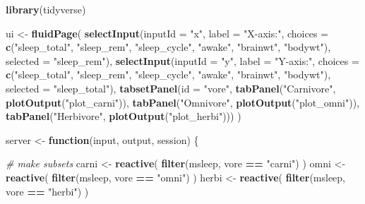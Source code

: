 \documentclass[]{book}
\newenvironment{Shaded}{\begin{snugshade}}{\end{snugshade}}
\newcommand{\CommentTok}[1]{\textcolor[rgb]{0.56,0.35,0.01}{\textit{#1}}}
\newcommand{\ControlFlowTok}[1]{\textcolor[rgb]{0.13,0.29,0.53}{\textbf{#1}}}
\newcommand{\DataTypeTok}[1]{\textcolor[rgb]{0.13,0.29,0.53}{#1}}
\newcommand{\KeywordTok}[1]{\textcolor[rgb]{0.13,0.29,0.53}{\textbf{#1}}}
\newcommand{\NormalTok}[1]{#1}
\newcommand{\OperatorTok}[1]{\textcolor[rgb]{0.81,0.36,0.00}{\textbf{#1}}}
\newcommand{\StringTok}[1]{\textcolor[rgb]{0.31,0.60,0.02}{#1}}
\begin{document}
\begin{Shaded}
\begin{Highlighting}[]
\KeywordTok{library}\NormalTok{(tidyverse)}

\NormalTok{ui <-}\StringTok{ }\KeywordTok{fluidPage}\NormalTok{(}
  \KeywordTok{selectInput}\NormalTok{(}\DataTypeTok{inputId =} \StringTok{"x"}\NormalTok{,}
              \DataTypeTok{label =} \StringTok{"X-axis:"}\NormalTok{,}
              \DataTypeTok{choices =} \KeywordTok{c}\NormalTok{(}\StringTok{"sleep_total"}\NormalTok{, }\StringTok{"sleep_rem"}\NormalTok{, }\StringTok{"sleep_cycle"}\NormalTok{, }
                          \StringTok{"awake"}\NormalTok{, }\StringTok{"brainwt"}\NormalTok{, }\StringTok{"bodywt"}\NormalTok{),}
              \DataTypeTok{selected =} \StringTok{"sleep_rem"}\NormalTok{),}
  \KeywordTok{selectInput}\NormalTok{(}\DataTypeTok{inputId =} \StringTok{"y"}\NormalTok{,}
              \DataTypeTok{label =} \StringTok{"Y-axis:"}\NormalTok{,}
              \DataTypeTok{choices =} \KeywordTok{c}\NormalTok{(}\StringTok{"sleep_total"}\NormalTok{, }\StringTok{"sleep_rem"}\NormalTok{, }\StringTok{"sleep_cycle"}\NormalTok{, }
                          \StringTok{"awake"}\NormalTok{, }\StringTok{"brainwt"}\NormalTok{, }\StringTok{"bodywt"}\NormalTok{),}
              \DataTypeTok{selected =} \StringTok{"sleep_total"}\NormalTok{),}
  \KeywordTok{tabsetPanel}\NormalTok{(}\DataTypeTok{id =} \StringTok{"vore"}\NormalTok{,}
              \KeywordTok{tabPanel}\NormalTok{(}\StringTok{"Carnivore"}\NormalTok{,}
                       \KeywordTok{plotOutput}\NormalTok{(}\StringTok{"plot_carni"}\NormalTok{)),}
              \KeywordTok{tabPanel}\NormalTok{(}\StringTok{"Omnivore"}\NormalTok{,}
                       \KeywordTok{plotOutput}\NormalTok{(}\StringTok{"plot_omni"}\NormalTok{)),}
              \KeywordTok{tabPanel}\NormalTok{(}\StringTok{"Herbivore"}\NormalTok{,}
                       \KeywordTok{plotOutput}\NormalTok{(}\StringTok{"plot_herbi"}\NormalTok{)))}
\NormalTok{)}

\NormalTok{server <-}\StringTok{ }\ControlFlowTok{function}\NormalTok{(input, output, session) \{}

  \CommentTok{# make subsets}
\NormalTok{  carni <-}\StringTok{ }\KeywordTok{reactive}\NormalTok{( }\KeywordTok{filter}\NormalTok{(msleep, vore }\OperatorTok{==}\StringTok{ "carni"}\NormalTok{) )}
\NormalTok{  omni  <-}\StringTok{ }\KeywordTok{reactive}\NormalTok{( }\KeywordTok{filter}\NormalTok{(msleep, vore }\OperatorTok{==}\StringTok{ "omni"}\NormalTok{)  )}
\NormalTok{  herbi <-}\StringTok{ }\KeywordTok{reactive}\NormalTok{( }\KeywordTok{filter}\NormalTok{(msleep, vore }\OperatorTok{==}\StringTok{ "herbi"}\NormalTok{) )}


\end{Highlighting}
\end{Shaded}
\end{document}
